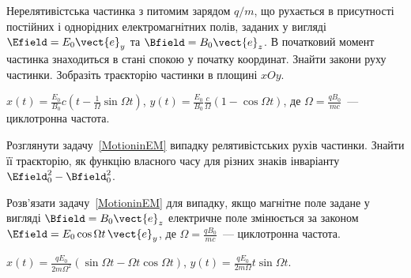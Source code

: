\begin{problem}\label{MotioninEM}
Нерелятивістська частинка з питомим зарядом $q/m$, що рухається в присутності постійних і однорідних електромагнітних полів, заданих у вигляді $\Efield = E_0\vect{e}_y$ та $\Bfield = B_0\vect{e}_z$. В початковий момент частинка знаходиться в стані спокою у початку координат. Знайти закони руху частинки. Зобразіть траєкторію частинки в площині $xOy$.
\begin{solution}
	$x(t)  = \frac{E_0}{B_0}c\left( t - \frac{1}{\Omega}\sin\Omega t \right) $,
	$y(t)  = \frac{E_0}{B_0} \frac{c}{\Omega}\left( 1 - \cos\Omega t \right) $, де $\Omega = \frac{qB_0}{mc}$~--- циклотронна частота.
\end{solution}
\end{problem}

\begin{problem}
Розглянути задачу~\ref{MotioninEM} випадку релятивістських рухів частинки. Знайти її траєкторію, як функцію власного часу для різних знаків інваріанту $\Efield_0^2-\Bfield_0^2$.
\end{problem}


\begin{problem}
Розв'язати задачу~\ref{MotioninEM} для випадку, якщо магнітне поле задане у вигляді $\Bfield = B_0\vect{e}_z$ електричне поле змінюється за законом $\Efield = E_0\cos\Omega t\,\vect{e}_y$,  де $\Omega = \frac{qB_0}{mc}$~--- циклотронна частота.
\begin{solution}
	$x(t)  = \frac{qE_0}{2m\Omega^2}\left( \sin\Omega t - \Omega t\cos\Omega t \right) $,
	$y(t)  = \frac{qE_0}{2m\Omega}t\sin\Omega t$.
\end{solution}
\end{problem}



